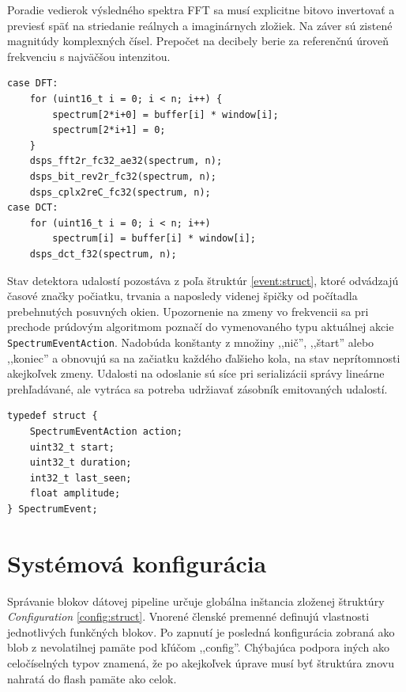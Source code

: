Poradie vedierok výsledného spektra FFT sa musí explicitne bitovo invertovať a previesť späť na striedanie
reálnych a imaginárnych zložiek. Na záver sú zistené magnitúdy komplexných čísel.
Prepočet na decibely berie za referenčnú úroveň frekvenciu s najväčšou intenzitou.

\begin{lstlisting}[style=cstyle,label={fft},caption=Fourierová a kosínusová transformácia s ESP DSP knižnicou]
case DFT:
	for (uint16_t i = 0; i < n; i++) {
		spectrum[2*i+0] = buffer[i] * window[i];
		spectrum[2*i+1] = 0;
	}
	dsps_fft2r_fc32_ae32(spectrum, n);
	dsps_bit_rev2r_fc32(spectrum, n);
	dsps_cplx2reC_fc32(spectrum, n);
case DCT:
	for (uint16_t i = 0; i < n; i++)
    	spectrum[i] = buffer[i] * window[i];
    dsps_dct_f32(spectrum, n);
\end{lstlisting}

Stav detektora udalostí pozostáva z poľa štruktúr \ref{event:struct}, ktoré odvádzajú časové značky
počiatku, trvania a naposledy videnej špičky od počítadla prebehnutých posuvných okien. Upozornenie na
zmeny vo frekvencii sa pri prechode prúdovým algoritmom poznačí do vymenovaného typu
aktuálnej akcie \verb|SpectrumEventAction|. Nadobúda konštanty z množiny ,,nič'', ,,štart'' alebo ,,koniec'' a
obnovujú sa na začiatku každého ďalšieho kola, na stav neprítomnosti akejkoľvek zmeny. Udalosti na odoslanie
sú síce pri serializácii správy lineárne prehľadávané, ale vytráca sa potreba udržiavať zásobník emitovaných udalostí.

\begin{lstlisting}[style=cstyle,label={event:struct},
caption={Štruktúra udalosti frekvenčného vedierka},morekeywords={SpectrumEvent}]
typedef struct {
    SpectrumEventAction action;
    uint32_t start;
    uint32_t duration;
    int32_t last_seen;
    float amplitude;
} SpectrumEvent;
\end{lstlisting}

\section{Systémová konfigurácia}
Správanie blokov dátovej pipeline určuje globálna inštancia zloženej štruktúry \emph{Configuration} \ref{config:struct}.
Vnorené členské premenné definujú vlastnosti jednotlivých funkčných blokov. Po zapnutí je posledná
konfigurácia zobraná ako blob z nevolatilnej pamäte pod kľúčom ,,config''. Chýbajúca podpora iných ako celočíselných
typov znamená, že po akejkoľvek úprave musí byť štruktúra znovu nahratá do flash pamäte ako celok.

